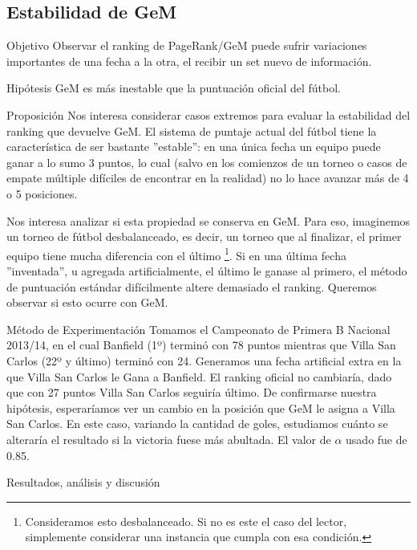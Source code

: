 \subsection{Estabilidad de GeM}
\label{subsec:exp7}
\begin{LaTeXdescription}
    \item[Objetivo] Observar el ranking de PageRank/GeM puede sufrir variaciones
        importantes de una fecha a la otra, el recibir un set nuevo de
        informaci\'on.\\

    \item[Hip\'otesis] GeM es m\'as inestable que la puntuaci\'on oficial del
        f\'utbol.\\

    \item[Proposici\'on] Nos interesa considerar casos extremos para evaluar la
        estabilidad del ranking que devuelve GeM. El sistema de puntaje actual
        del f\'utbol tiene la caracter\'istica de ser bastante ''estable'': en
        una \'unica fecha un equipo puede ganar a lo sumo 3 puntos, lo cual
        (salvo en los comienzos de un torneo o casos de empate m\'ultiple
        dif\'iciles de encontrar en la realidad) no lo hace avanzar m\'as de 4 o
        5 posiciones.

        \par Nos interesa analizar si esta propiedad se conserva en GeM. Para
        eso, imaginemos un torneo de f\'utbol desbalanceado, es decir, un torneo
        que al finalizar, el primer equipo tiene mucha diferencia con el
        \'ultimo \footnote{Consideramos esto desbalanceado. Si no es este el
        caso del lector, simplemente considerar una instancia que cumpla con esa
        condici\'on.}. Si en una \'ultima fecha ''inventada'', u agregada
        artificialmente, el \'ultimo le ganase al primero, el m\'etodo de
        puntuaci\'on est\'andar dif\'icilmente altere demasiado el ranking.
        Queremos observar si esto ocurre con GeM.\\

    \item[M\'etodo de Experimentaci\'on] Tomamos el Campeonato de Primera B
        Nacional 2013/14, en el cual Banfield (1º) termin\'o con 78 puntos
        mientras que Villa San Carlos (22º y \'ultimo) termin\'o con 24.
        Generamos una fecha artificial extra en la que Villa San Carlos le Gana
        a Banfield. El ranking oficial no cambiar\'ia, dado que con 27
        puntos Villa San Carlos seguir\'ia \'ultimo. De confirmarse nuestra
        hip\'otesis, esperar\'iamos ver un cambio en la posición que GeM le
        asigna a Villa San Carlos. En este caso, variando la cantidad de goles,
        estudiamos cu\'anto se alterar\'ia el resultado si la victoria fuese
        m\'as abultada. El valor de $\alpha$ usado fue de 0.85.\\

    \item[Resultados, an\'alisis y discusi\'on]
\end{LaTeXdescription}


